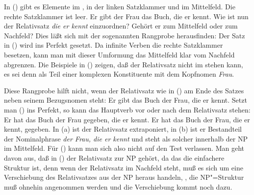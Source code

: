 In () gibt es Elemente im \vf, in der linken Satzklammer
und im Mittelfeld. Die rechte Satzklammer ist leer.
\ea
Er gibt der Frau das Buch, die er kennt.
\z
Wie ist nun der Relativsatz \emph{die er kennt} einzuordnen? Gehört
er zum Mittelfeld oder zum Nachfeld?
Dies läßt sich mit der sogenannten Rangprobe \citep[]{Bech55a} herausfinden:
Der Satz in () wird ins Perfekt gesetzt. Da infinite Verben
die rechte Satzklammer besetzen, kann man mit dieser Umformung das Mittelfeld
klar vom Nachfeld abgrenzen. Die Beispiele in () zeigen,
daß der Relativsatz nicht im \mf stehen kann, es sei denn als Teil
einer komplexen Konstituente mit dem Kopfnomen \emph{Frau}.
\eal
{}
\zl

\noindent
Diese Rangprobe hilft nicht, wenn der Relativsatz wie in () am Ende des Satzes neben seinem Bezugsnomen steht:
\ea
Er gibt das Buch der Frau, die er kennt.
\z
Setzt man () ins Perfekt, so kann das Hauptverb vor oder nach dem Relativsatz stehen:
\eal
\ex Er hat das Buch der Frau gegeben, die er kennt.
\ex Er hat das Buch der Frau, die er kennt, gegeben.
\zl
In (a) ist der Relativsatz extraponiert, in (b) ist er Bestandteil der Nominalphrase
\emph{der Frau, die er kennt} und steht als solcher innerhalb der NP im Mittelfeld. Für () kann man sich also
nicht auf den Test verlassen. Man geht davon aus, daß in () der Relativsatz zur NP gehört,
da das die einfachere Struktur ist, denn wenn der Relativsatz im Nachfeld steht, muß es sich um eine
Verschiebung des Relativsatzes aus der NP heraus handeln, \dash, die NP"=Struktur muß ohnehin
angenommen werden und die Verschiebung kommt noch dazu.



